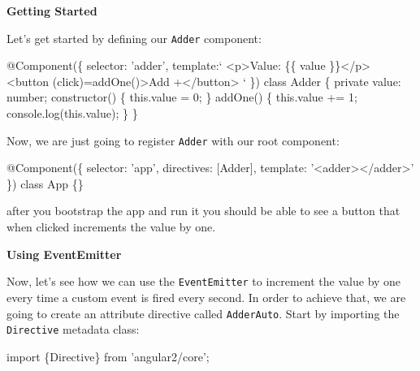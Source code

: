 \documentclass[12pt,]{article}
\newenvironment{Shaded}{}{}
\newcommand{\KeywordTok}[1]{\textcolor[rgb]{0.00,0.00,1.00}{{#1}}}
\newcommand{\DecValTok}[1]{{#1}}
\newcommand{\FunctionTok}[1]{{#1}}
\newcommand{\NormalTok}[1]{{#1}}
\begin{document}
\textbf{Getting Started}

Let's get started by defining our \texttt{Adder} component:

\begin{Shaded}
\begin{Highlighting}[numbers=left,,]
\FunctionTok{@Component}\NormalTok{(\{}
  \NormalTok{selector: 'adder',}
  \NormalTok{template:`}
  \NormalTok{<p>Value: \{\{ value \}\}</p>}
  \NormalTok{<}\FunctionTok{button} \NormalTok{(click)=}\FunctionTok{addOne}\NormalTok{()>Add +</button>}
  \NormalTok{`}
\NormalTok{\})}
\KeywordTok{class} \NormalTok{Adder \{}
  \KeywordTok{private} \NormalTok{value: number;}
  \FunctionTok{constructor}\NormalTok{() \{}
    \KeywordTok{this}\NormalTok{.}\FunctionTok{value} \NormalTok{= }\DecValTok{0}\NormalTok{;}
  \NormalTok{\}}
  \FunctionTok{addOne}\NormalTok{() \{}
  \KeywordTok{this}\NormalTok{.}\FunctionTok{value} \NormalTok{+= }\DecValTok{1}\NormalTok{;}
  \NormalTok{console.}\FunctionTok{log}\NormalTok{(}\KeywordTok{this}\NormalTok{.}\FunctionTok{value}\NormalTok{);}
  \NormalTok{\}}
\NormalTok{\}}
\end{Highlighting}
\end{Shaded}

Now, we are just going to register \texttt{Adder} with our root
component:

\begin{Shaded}
\begin{Highlighting}[numbers=left,,]
\FunctionTok{@Component}\NormalTok{(\{}
  \NormalTok{selector: 'app',}
  \NormalTok{directives: [Adder],}
  \NormalTok{template: '<adder></adder>'}
\NormalTok{\})}
\KeywordTok{class} \NormalTok{App \{\}}
\end{Highlighting}
\end{Shaded}

after you bootstrap the app and run it you should be able to see a
button that when clicked increments the value by one.

\textbf{Using EventEmitter}

Now, let's see how we can use the \texttt{EventEmitter} to increment the
value by one every time a custom event is fired every second. In order
to achieve that, we are going to create an attribute directive called
\texttt{AdderAuto}. Start by importing the \texttt{Directive} metadata
class:

\begin{Shaded}
\begin{Highlighting}[numbers=left,,]
\KeywordTok{import \{Directive\} from 'angular2/core';}
\end{Highlighting}
\end{Shaded}
\end{document}
